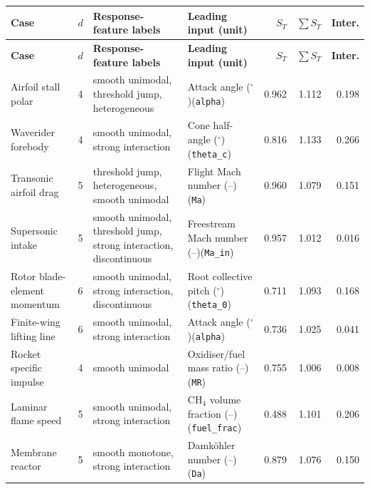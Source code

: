 \SITableFont
\setlength{\tabcolsep}{3pt}
\begin{longtable}{@{}>{\raggedright\arraybackslash}p{2.7cm}c>{\raggedright\arraybackslash}p{3.5cm}>{\raggedright\arraybackslash}p{3.9cm}rrr@{}}
\toprule
\textbf{Case} & $d$ & \textbf{Response-feature labels} & \textbf{Leading input (unit)} & $S_T$ & $\sum S_T$ & \textbf{Inter.} \\
\midrule
\endfirsthead
\toprule
\textbf{Case} & $d$ & \textbf{Response-feature labels} & \textbf{Leading input (unit)} & $S_T$ & $\sum S_T$ & \textbf{Inter.} \\
\midrule
\endhead
Airfoil stall polar & 4 & smooth unimodal, threshold jump, heterogeneous & Attack angle ($^\circ$)\newline (\texttt{alpha}) & 0.962 & 1.112 & 0.198 \\
Waverider forebody & 4 & smooth unimodal, strong interaction & Cone half-angle ($^\circ$)\newline (\texttt{theta\_c}) & 0.816 & 1.133 & 0.266 \\
Transonic airfoil drag & 5 & threshold jump, heterogeneous, smooth unimodal & Flight Mach number (--)\newline (\texttt{Ma}) & 0.960 & 1.079 & 0.151 \\
Supersonic intake & 5 & smooth unimodal, threshold jump, strong interaction, discontinuous & Freestream Mach number (--)\newline (\texttt{Ma\_in}) & 0.957 & 1.012 & 0.016 \\
Rotor blade-element momentum & 6 & smooth unimodal, strong interaction, discontinuous & Root collective pitch ($^\circ$)\newline (\texttt{theta\_0}) & 0.711 & 1.093 & 0.168 \\
Finite-wing lifting line & 6 & smooth unimodal, strong interaction & Attack angle ($^\circ$)\newline (\texttt{alpha}) & 0.736 & 1.025 & 0.041 \\
Rocket specific impulse & 4 & smooth unimodal & Oxidiser/fuel mass ratio (--)\newline (\texttt{MR}) & 0.755 & 1.006 & 0.008 \\
Laminar flame speed & 5 & smooth unimodal, strong interaction & CH$_4$ volume fraction (--)\newline (\texttt{fuel\_frac}) & 0.488 & 1.101 & 0.206 \\
Membrane reactor & 5 & smooth monotone, strong interaction & Damk\"ohler number (--)\newline (\texttt{Da}) & 0.879 & 1.076 & 0.150 \\

\end{longtable}
